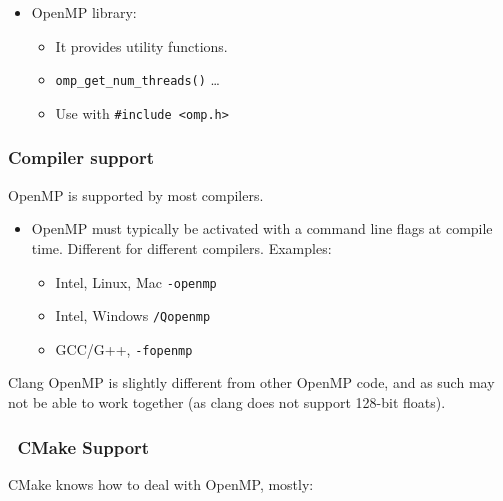 \begin{itemize}
\itemsep1pt\parskip0pt
\item
  OpenMP library:

  \begin{itemize}
  \itemsep1pt\parskip0pt
  \item
    It provides utility functions.
  \item
    \texttt{omp\_get\_num\_threads()} \ldots{}
  \item
    Use with \texttt{\#include \textless{}omp.h\textgreater{}}
  \end{itemize}
\end{itemize}

\subsubsection{Compiler support}\label{compiler-support}

OpenMP is supported by most compilers.

\begin{itemize}
\itemsep1pt\parskip0pt
\item
  OpenMP must typically be activated with a command line flags at
  compile time. Different for different compilers. Examples:

  \begin{itemize}
  \itemsep1pt\parskip0pt
  \item
    Intel, Linux, Mac \texttt{-openmp}
  \item
    Intel, Windows \texttt{/Qopenmp}
  \item
    GCC/G++, \texttt{-fopenmp}
  \end{itemize}
\end{itemize}

Clang OpenMP is slightly different from other OpenMP code, and as such
may not be able to work together (as clang does not support 128-bit
floats).

\subsubsection{~CMake Support}\label{cmake-support}

CMake knows how to deal with OpenMP, mostly:

\begin{Shaded}
\begin{Highlighting}[]

  \NormalTok{)}
   \NormalTok{)}
\NormalTok{()}
\end{Highlighting}
\end{Shaded}

